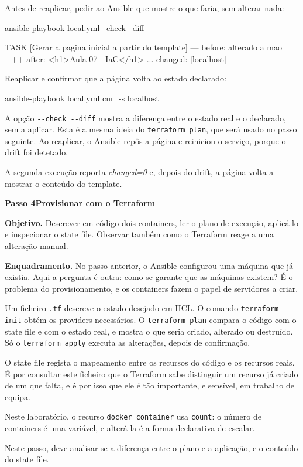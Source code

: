 \documentclass[11pt,a4paper]{article}
\newcommand{\passo}[2]{%
  \clearpage
  \begin{tcolorbox}[colback=SageMuted, colframe=SageMuted, coltext=white,
    boxrule=0pt, arc=4pt, left=14pt, right=14pt, top=10pt, bottom=10pt,
    before skip=0pt, after skip=0.6cm]
  {\Large\bfseries Passo #1}\hfill{\large\bfseries #2}
  \end{tcolorbox}
}
\newcommand{\cmd}[1]{\texttt{#1}}
\begin{document}
Antes de reaplicar, pedir ao Ansible que mostre o que faria, sem alterar nada:

\begin{terminal}
ansible-playbook local.yml --check --diff
\end{terminal}

\begin{saida}
TASK [Gerar a pagina inicial a partir do template]
--- before: alterado a mao
+++ after: <h1>Aula 07 - IaC</h1> ...
changed: [localhost]
\end{saida}

Reaplicar e confirmar que a página volta ao estado declarado:

\begin{terminal}
ansible-playbook local.yml
curl -s localhost
\end{terminal}

\begin{observe}
A opção \cmd{-{}-check -{}-diff} mostra a diferença entre o estado real e o declarado, sem a aplicar. Esta é a mesma ideia do \cmd{terraform plan}, que será usado no passo seguinte. Ao reaplicar, o Ansible repôs a página e reiniciou o serviço, porque o drift foi detetado.
\end{observe}

\begin{feito}
A segunda execução reporta \emph{changed=0} e, depois do drift, a página volta a mostrar o conteúdo do template.
\end{feito}

\passo{4}{Provisionar com o Terraform}

\textbf{Objetivo.} Descrever em código dois containers, ler o plano de execução, aplicá-lo e inspecionar o state file. Observar também como o Terraform reage a uma alteração manual.

\textbf{Enquadramento.} No passo anterior, o Ansible configurou uma máquina que já existia. Aqui a pergunta é outra: como se garante que as máquinas existem? É o problema do provisionamento, e os containers fazem o papel de servidores a criar.

\begin{teoria}
Um ficheiro \cmd{.tf} descreve o estado desejado em HCL. O comando \cmd{terraform init} obtém os providers necessários. O \cmd{terraform plan} compara o código com o state file e com o estado real, e mostra o que seria criado, alterado ou destruído. Só o \cmd{terraform apply} executa as alterações, depois de confirmação.

O state file regista o mapeamento entre os recursos do código e os recursos reais. É por consultar este ficheiro que o Terraform sabe distinguir um recurso já criado de um que falta, e é por isso que ele é tão importante, e sensível, em trabalho de equipa.

Neste laboratório, o recurso \cmd{docker\_container} usa \cmd{count}: o número de containers é uma variável, e alterá-la é a forma declarativa de escalar.

Neste passo, deve analisar-se a diferença entre o plano e a aplicação, e o conteúdo do state file.
\end{teoria}
\end{document}
